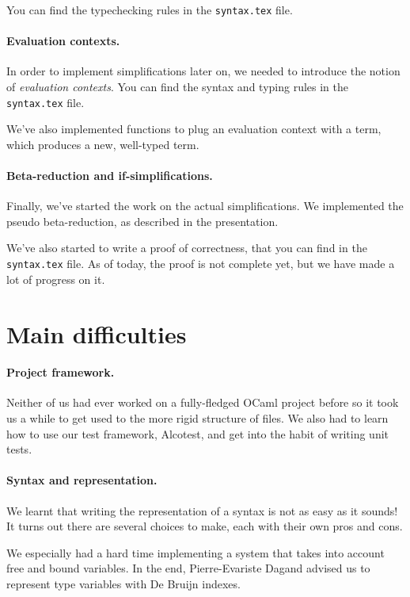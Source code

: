 \documentclass{article}
\begin{document}
You can find the typechecking rules in the {\tt syntax.tex} file.

\paragraph{Evaluation contexts.}In order to implement simplifications later on, we needed to 
introduce the notion of {\em evaluation contexts}. You can find the syntax and typing rules 
in the {\tt syntax.tex} file. 

We've also implemented functions to plug an evaluation context with a term, which produces a
new, well-typed term.

\paragraph{Beta-reduction and if-simplifications.}Finally, we've started the work on the 
actual simplifications. We implemented the pseudo beta-reduction, as described in the 
presentation.

We've also started to write a proof of correctness, that you can find in the {\tt syntax.tex} file.
As of today, the proof is not complete yet, but we have made a lot of progress on it.


\section{Main difficulties}
\paragraph{Project framework.}Neither of us had ever worked on a fully-fledged OCaml project before
so it took us a while to get used to the more rigid structure of files. We also had to learn how to use 
our test framework, Alcotest, and get into the habit of writing unit tests.

\paragraph{Syntax and representation.}We learnt that writing the representation of a syntax 
is not as easy as it sounds!
It turns out there are several choices to make, each with their own pros and cons. 

We especially had a hard time implementing a system that takes into account free and bound variables.
In the end, Pierre-Evariste Dagand advised us to represent type variables with De Bruijn indexes.
\end{document}
